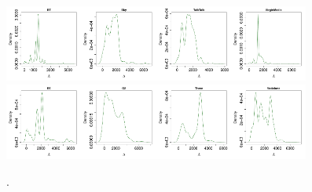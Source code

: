 \documentclass{bmcart}
\begin{document}
\begin{figure}[h!]
\caption{.}
\includegraphics[width=0.2249\textwidth]{imgs/BT-unblock-dist}\includegraphics[width=0.2249\textwidth]{imgs/Sky-unblock-dist}\includegraphics[width=0.2249\textwidth]{imgs/TalkTalk-unblock-dist}\includegraphics[width=0.2249\textwidth]{imgs/VirginMedia-unblock-dist}
\includegraphics[width=0.2249\textwidth]{imgs/EE-unblock-dist}\includegraphics[width=0.2249\textwidth]{imgs/O2-unblock-dist}\includegraphics[width=0.2249\textwidth]{imgs/Three-unblock-dist}\includegraphics[width=0.2249\textwidth]{imgs/Vodafone-unblock-dist}

\end{figure}
\end{document}
